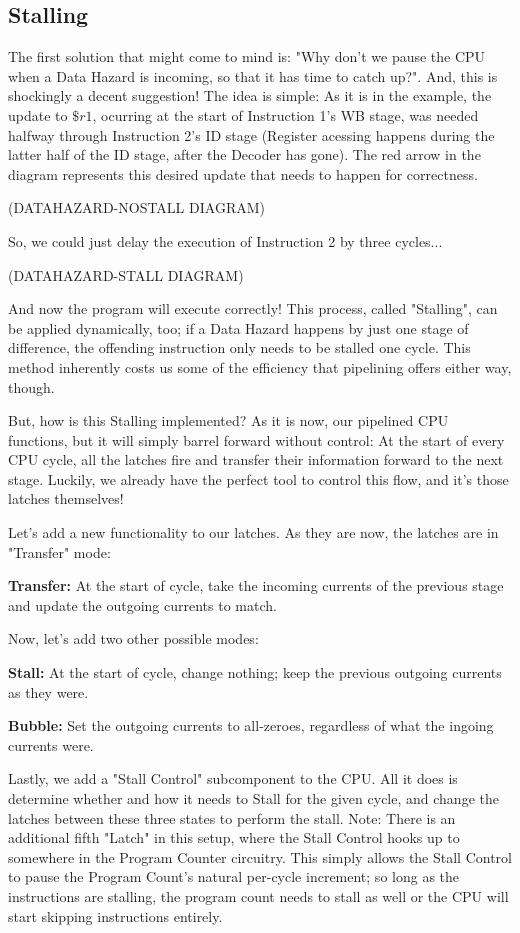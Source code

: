 \documentclass[12pt,twoside]{reedthesis}
\begin{document}
\subsection{Stalling}

The first solution that might come to mind is: "Why don't we pause the CPU when a Data Hazard is incoming, so that it has time to catch up?". And, this is shockingly a decent suggestion! The idea is simple: As it is in the example, the update to $\$r1$, ocurring at the start of Instruction 1's WB stage, was needed halfway through Instruction 2's ID stage (Register acessing happens during the latter half of the ID stage, after the Decoder has gone). The red arrow in the diagram represents this desired update that needs to happen for correctness.

(DATAHAZARD-NOSTALL DIAGRAM)

So, we could just delay the execution of Instruction 2 by three cycles...

(DATAHAZARD-STALL DIAGRAM)

And now the program will execute correctly! This process, called "Stalling", can be applied dynamically, too; if a Data Hazard happens by just one stage of difference, the offending instruction only needs to be stalled one cycle. This method inherently costs us some of the efficiency that pipelining offers either way, though.

But, how is this Stalling implemented? As it is now, our pipelined CPU functions, but it will simply barrel forward without control: At the start of every CPU cycle, all the latches fire and transfer their information forward to the next stage. Luckily, we already have the perfect tool to control this flow, and it's those latches themselves!

Let's add a new functionality to our latches. As they are now, the latches are in "Transfer" mode:

\qquad \textbf{Transfer:} At the start of cycle, take the incoming currents of the previous stage and update the outgoing currents to match.

Now, let's add two other possible modes:

\qquad \textbf{Stall:} At the start of cycle, change nothing; keep the previous outgoing currents as they were.

\qquad \textbf{Bubble:} Set the outgoing currents to all-zeroes, regardless of what the ingoing currents were.

Lastly, we add a "Stall Control" subcomponent to the CPU. All it does is determine whether and how it needs to Stall for the given cycle, and  change the latches between these three states to perform the stall. Note: There is an additional fifth "Latch" in this setup, where the Stall Control hooks up to somewhere in the Program Counter circuitry. This simply allows the Stall Control to pause the Program Count's natural per-cycle increment; so long as the instructions are stalling, the program count needs to stall as well or the CPU will start skipping instructions entirely.
\end{document}
